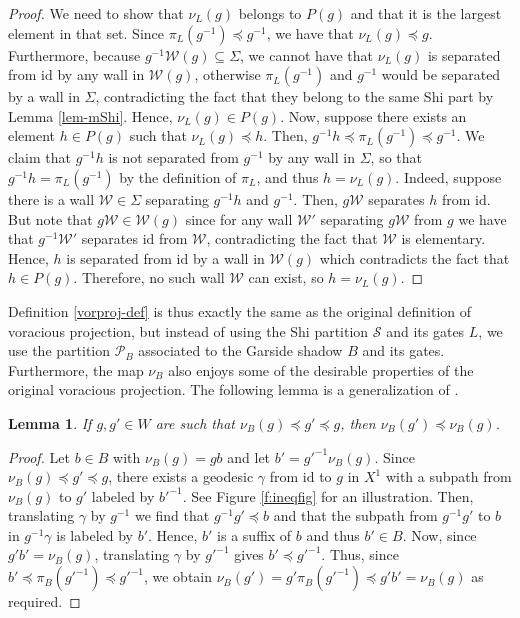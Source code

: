 \documentclass[a4paper,12pt,leqno]{amsart}
\newtheorem{lemma}[theorem]{Lemma}
\theoremstyle{definition}
\newcommand{\W}{\mathcal{W}}
\newcommand{\id}{\text{id}}
\newcommand{\vr}{\nu}
\begin{document}
\begin{proof}
    We need to show that $\vr_L(g)$ belongs to $P(g)$ and that it is the largest element in that set. Since $\pi_L(g^{-1}) \preceq g^{-1}$, we have that $\vr_L(g) \preceq g$. Furthermore, because $g^{-1}\W(g) \subseteq \Sigma$, we cannot have that $\vr_L(g)$ is separated from $\id$ by any wall in $\W(g)$, otherwise $\pi_L(g^{-1})$ and $g^{-1}$ would be separated by a wall in $\Sigma$, contradicting the fact that they belong to the same Shi part by Lemma \ref{lem-mShi}. Hence, $\vr_L(g) \in P(g)$. Now, suppose there exists an element $h \in P(g)$ such that $\vr_L(g) \preceq h$. Then, $g^{-1}h \preceq \pi_L(g^{-1}) \preceq g^{-1}$. We claim that $g^{-1}h$ is not separated from $g^{-1}$ by any wall in $\Sigma$, so that $g^{-1}h = \pi_L(g^{-1})$ by the definition of $\pi_L$, and thus $h = \vr_L(g)$. Indeed, suppose there is a wall $\W \in \Sigma$ separating $g^{-1}h$ and $g^{-1}$. Then, $g\W$ separates $h$ from $\id$. But note that $g\W \in \W(g)$ since for any wall $\W'$ separating $g\W$ from $g$ we have that $g^{-1}\W'$ separates $\id$ from $\W$, contradicting the fact that $\W$ is elementary. Hence, $h$ is separated from $\id$ by a wall in $\W(g)$ which contradicts the fact that $h \in P(g)$. Therefore, no such wall $\W$ can exist, so $h = \vr_L(g)$.
\end{proof}

Definition \ref{vorproj-def} is thus exactly the same as the original definition of voracious projection, but instead of using the Shi partition $\mathscr{S}$ and its gates $L$, we use the partition $\mathscr{P}_B$ associated to the Garside shadow $B$ and its gates. Furthermore, the map $\vr_B$ also enjoys some of the desirable properties of the original voracious projection. The following lemma is a generalization of \cite[Lem 5.1]{OP-bi}.

\begin{lemma} \label{v-ineq-lemma}
    If $g,g' \in W$ are such that $\vr_B(g) \preceq g' \preceq g$, then $\vr_B(g') \preceq \vr_B(g)$.
\end{lemma}

\begin{proof}
    Let $b \in B$ with $\vr_B(g) = gb$ and let $b' = g'^{-1}\vr_B(g)$. Since $\vr_B(g) \preceq g' \preceq g$, there exists a geodesic $\gamma$ from $\id$ to $g$ in $X^1$ with a subpath from $\vr_B(g)$ to $g'$ labeled by $b'^{-1}$. See Figure \ref{f:ineqfig} for an illustration. Then, translating $\gamma$ by $g^{-1}$ we find that $g^{-1}g' \preceq b$ and that the subpath from $g^{-1}g'$ to $b$ in $g^{-1}\gamma$ is labeled by $b'$. Hence, $b'$ is a suffix of $b$ and thus $b'\in B$. Now, since $g'b' = \vr_B(g)$, translating $\gamma$ by $g'^{-1}$ gives $b' \preceq g'^{-1}$. Thus, since $b' \preceq \pi_B(g'^{-1}) \preceq g'^{-1}$, we obtain $\vr_B(g') = g'\pi_B(g'^{-1}) \preceq g'b' = \vr_B(g)$ as required.
\end{proof}
\end{document}
